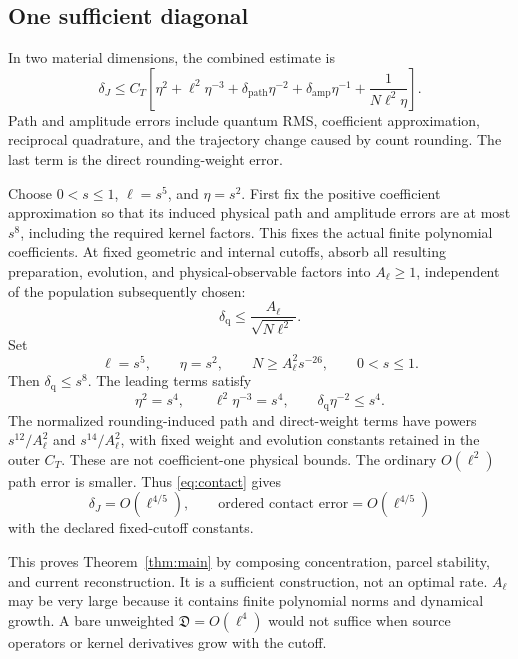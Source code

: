 \documentclass[11pt]{article}
\begin{document}
\subsection{One sufficient diagonal}
In two material dimensions, the combined estimate is
\begin{equation}\label{eq:combinedcurrent}
\delta_J\le C_T\left[
\eta^2+\ell^2\eta^{-3}
+\delta_{\mathrm{path}}\eta^{-2}
+\delta_{\mathrm{amp}}\eta^{-1}
+\frac1{N\ell^2\eta}\right].
\end{equation}
Path and amplitude errors include quantum RMS, coefficient approximation, reciprocal quadrature, and the trajectory change caused by count rounding. The last term is the direct rounding-weight error.

Choose $0<s\le1$, $\ell=s^5$, and $\eta=s^2$. First fix the positive coefficient approximation so that its induced physical path and amplitude errors are at most $s^8$, including the required kernel factors. This fixes the actual finite polynomial coefficients. At fixed geometric and internal cutoffs, absorb all resulting preparation, evolution, and physical-observable factors into $A_\ell\ge1$, independent of the population subsequently chosen:
\[
\delta_{\mathrm q}\le\frac{A_\ell}{\sqrt{N\ell^2}}.
\]
Set
\begin{equation}\label{eq:diag}
\ell=s^5,\qquad\eta=s^2,\qquad
N\ge A_\ell^2s^{-26},\qquad0<s\le1.
\end{equation}
Then $\delta_{\mathrm q}\le s^8$. The leading terms satisfy
\[
\eta^2=s^4,\qquad
\ell^2\eta^{-3}=s^4,\qquad
\delta_{\mathrm q}\eta^{-2}\le s^4.
\]
The normalized rounding-induced path and direct-weight terms have powers $s^{12}/A_\ell^2$ and $s^{14}/A_\ell^2$, with fixed weight and evolution constants retained in the outer $C_T$. These are not coefficient-one physical bounds. The ordinary $O(\ell^2)$ path error is smaller. Thus \eqref{eq:contact} gives
\begin{equation}\label{eq:rate}
\boxed{\delta_J=O(\ell^{4/5}),\qquad
\text{ordered contact error}=O(\ell^{4/5})}
\end{equation}
with the declared fixed-cutoff constants.

This proves Theorem~\ref{thm:main} by composing concentration, parcel stability, and current reconstruction. It is a sufficient construction, not an optimal rate. $A_\ell$ may be very large because it contains finite polynomial norms and dynamical growth. A bare unweighted $\mathfrak D=O(\ell^4)$ would not suffice when source operators or kernel derivatives grow with the cutoff.
\end{document}

